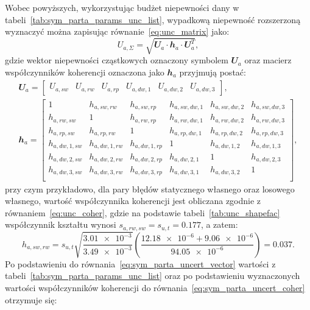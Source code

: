 Wobec powyższych, wykorzystując budżet niepewności dany w tabeli~\ref{tab:sym_parta_params_unc_list}, wypadkową niepewność rozszerzoną wyznaczyć można zapisując równanie~\eqref{eq:unc_matrix} jako:
\begin{equation}
U_{a,\Sigma} = \sqrt{\mathbfit{U}_{a} \cdot \mathbfit{h}_{a} \cdot \mathbfit{U}_{a}^{T}} \label{eq:sym_parta_uncert_sum},
\end{equation}
gdzie wektor niepewności cząstkowych oznaczony symbolem $\mathbfit{U}_{a}$ oraz macierz współczynników koherencji oznaczona jako $\mathbfit{h}_{a}$ przyjmują postać:
\begin{gather}
\mathbfit{U}_{a} =
\begin{bmatrix}
U_{a,sw} & U_{a,rw} & U_{a,rp} & U_{a,dw,1} & U_{a,dw,2} & U_{a,dw,3}
\end{bmatrix}
\label{eq:sym_parta_uncert_vector}, \\
\mathbfit{h}_{a} =
\begin{bmatrix}
1             & h_{a,sw,rw}   & h_{a,sw,rp}   & h_{a,sw,dw,1} & h_{a,sw,dw,2} & h_{a,sw,dw,3} \\
h_{a,rw,sw}   & 1             & h_{a,rw,rp}   & h_{a,rw,dw,1} & h_{a,rw,dw,2} & h_{a,rw,dw,3} \\
h_{a,rp,sw}   & h_{a,rp,rw}   & 1             & h_{a,rp,dw,1} & h_{a,rp,dw,2} & h_{a,rp,dw,3} \\
h_{a,dw,1,sw} & h_{a,dw,1,rw} & h_{a,dw,1,rp} & 1             & h_{a,dw,1,2}  & h_{a,dw,1,3}  \\
h_{a,dw,2,sw} & h_{a,dw,2,rw} & h_{a,dw,2,rp} & h_{a,dw,2,1}  & 1             & h_{a,dw,2,3}  \\
h_{a,dw,3,sw} & h_{a,dw,3,rw} & h_{a,dw,3,rp} & h_{a,dw,3,1}  & h_{a,dw,3,2}  & 1             \\
\end{bmatrix}
\label{eq:sym_parta_uncert_coher},
\end{gather}
przy czym przykładowo, dla pary błędów statycznego własnego oraz losowego własnego, wartość współczynnika koherencji jest obliczana zgodnie z równaniem~\eqref{eq:unc_coher}, gdzie na podstawie tabeli~\ref{tab:unc_shapefac} współczynnik kształtu wynosi $s_{a,rw,sw} = s_{u,t} = \num{0.177}$, a zatem:
\begin{equation}
h_{a,sw,rw} = s_{u,t} \sqrt{\frac{\num{3.01e-3}}{\num{3.49e-3}}} \left( \frac{\num{12.18e-6} + \num{9.06e-6}}{\num{94.05e-6}} \right) = \num{0.037} \label{eq:sym_parta_coher_sw_rw}.
\end{equation}
Po podstawieniu do równania~\eqref{eq:sym_parta_uncert_vector} wartości z tabeli~\ref{tab:sym_parta_params_unc_list} oraz po podstawieniu wyznaczonych wartości współczynników koherencji do równania~\eqref{eq:sym_parta_uncert_coher} otrzymuje się:
